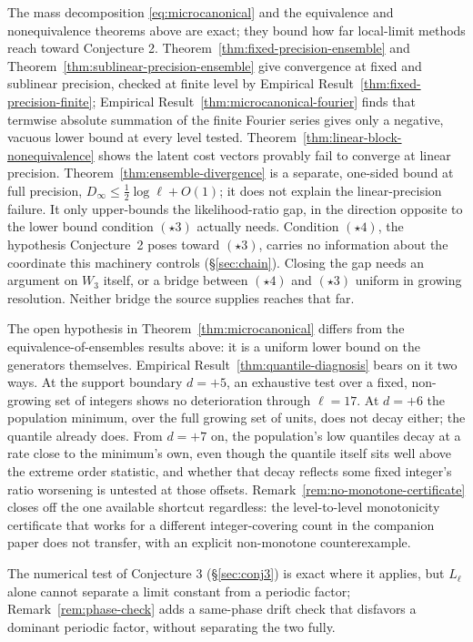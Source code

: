 \documentclass[11pt]{article}
\theoremstyle{remark}
\begin{document}
The mass decomposition \eqref{eq:microcanonical} and the equivalence
and nonequivalence theorems above are exact; they bound how far
local-limit methods reach toward Conjecture 2.
Theorem~\ref{thm:fixed-precision-ensemble} and
Theorem~\ref{thm:sublinear-precision-ensemble} give convergence at
fixed and sublinear precision, checked at finite level by Empirical
Result~\ref{thm:fixed-precision-finite}; Empirical
Result~\ref{thm:microcanonical-fourier} finds that termwise absolute
summation of the finite Fourier series gives only a negative, vacuous
lower bound at every level tested.
Theorem~\ref{thm:linear-block-nonequivalence}
shows the latent cost vectors provably fail to converge at linear
precision. Theorem~\ref{thm:ensemble-divergence} is a separate,
one-sided bound at full precision, $D_\infty\le\frac12\log\ell+O(1)$;
it does not explain the linear-precision failure. It only
upper-bounds the likelihood-ratio gap, in the direction opposite to
the lower bound condition $(\star3)$ actually needs. Condition
$(\star4)$, the hypothesis Conjecture~2 poses toward $(\star3)$,
carries no information about the coordinate this machinery
controls (\S\ref{sec:chain}). Closing the gap needs an argument on
$W_3$ itself, or a bridge between $(\star4)$ and $(\star3)$ uniform in
growing resolution. Neither bridge the source supplies reaches that
far.

The open hypothesis in Theorem~\ref{thm:microcanonical} differs from
the equivalence-of-ensembles results above: it is a uniform lower
bound on the generators themselves. Empirical
Result~\ref{thm:quantile-diagnosis} bears on it two ways. At the
support boundary $d=+5$, an exhaustive test over a fixed, non-growing
set of integers shows no deterioration through $\ell=17$. At $d=+6$
the population minimum, over the full growing set of units, does not
decay either; the quantile already does. From
$d=+7$ on, the population's low quantiles decay
at a rate close to the minimum's own, even though the quantile itself
sits well above the extreme order statistic, and whether that decay
reflects some fixed integer's
ratio worsening is untested at those offsets. Remark~\ref{rem:no-monotone-certificate}
closes off the one available shortcut regardless: the level-to-level
monotonicity certificate that works for a different integer-covering
count in the companion paper does not transfer, with an explicit
non-monotone counterexample.

The numerical test of Conjecture 3 (\S\ref{sec:conj3}) is exact where
it applies, but $L_\ell$ alone cannot separate a limit constant
from a periodic factor; Remark~\ref{rem:phase-check} adds a same-phase
drift check that disfavors a dominant periodic factor, without
separating the two fully.
\end{document}
